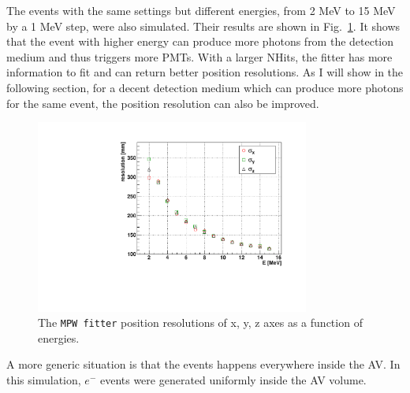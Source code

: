 The events with the same settings but different energies, from 2 MeV to 15 MeV by a 1 MeV step, were also simulated. Their results are shown in Fig.~\ref{fig:MPWposResol}. It shows that the event with higher energy can produce more photons from the detection medium and thus triggers more PMTs. With a larger NHits, the fitter has more information to fit and can return better position resolutions. As I will show in the following section, for a decent detection medium which can produce more photons for the same event, the position resolution can also be improved.
 
\begin{figure}[htbp]
	\centering	
	\includegraphics[width=9cm]{MPW_posResolVsE.pdf}
	\caption{The \texttt{MPW fitter} position resolutions of x, y, z axes as a function of energies.}
	\label{fig:MPWposResol}
\end{figure}

A more generic situation is that the events happens everywhere inside the AV. In this simulation, $e^-$ events were generated uniformly inside the AV volume. 


